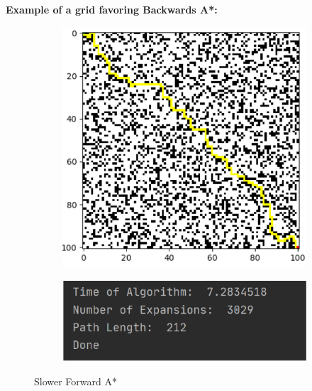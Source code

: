 \documentclass{article}
\begin{document}
\textbf{Example of a grid favoring Backwards A*:}
\begin{figure}[h!]
\begin{subfigure}{.5\textwidth}
  \centering
  \includegraphics[width=.8\linewidth]{fastfrontA.png}
  \label{fig:sfig1}
\end{subfigure}%
\begin{subfigure}{.5\textwidth}
  \centering
  \includegraphics[width=.8\linewidth]{fastfrontAstats.png}
  \label{fig:sfig2}
\end{subfigure}
\caption{Slower Forward A*}
\label{fig:fig}
\end{figure}
\end{document}

